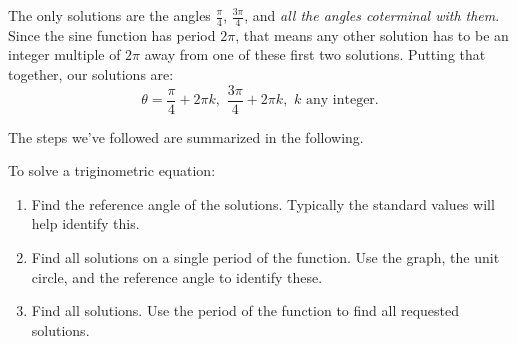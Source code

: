 \documentclass[nooutcomes]{ximera}
\begin{document}
\begin{image}
\end{image}

The only solutions are the angles $\frac{\pi}{4}$, $\frac{3\pi}{4}$, and \emph{all the angles coterminal with them}. Since the sine function has period
$2\pi$, that means any other solution has to be an integer multiple of $2\pi$ away from one of these first two solutions. Putting that together, our solutions
are:
$$ \theta = \frac{\pi}{4} + 2\pi k , \,\, \frac{3\pi}{4}+2\pi k , \,\, k \textrm{ any integer}. $$

The steps we've followed are summarized in the following.
\begin{callout}
	To solve a triginometric equation:
	\begin{enumerate}
		\item Find the reference angle of the solutions. Typically the standard values will help identify this.
		\item Find all solutions on a single period of the function. Use the graph, the unit circle, and the reference angle to identify these.
		\item Find all solutions. Use the period of the function to find all requested solutions.
	\end{enumerate}
\end{callout}
\end{document}
